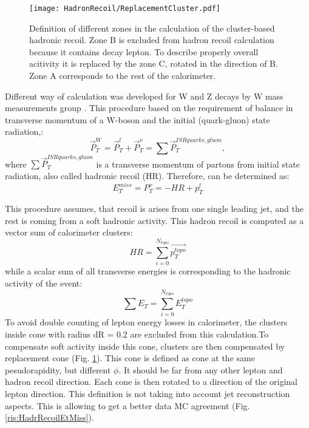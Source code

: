 \begin{figure}[!tbp]
\begin{center}
\begin{minipage}[h]{0.49\linewidth}
\texttt{[image: HadronRecoil/ReplacementCluster.pdf]}
\end{minipage}

\caption{Definition of different zones in the calculation of the cluster-based hadronic recoil. Zone B is excluded from hadron recoil calculation because it contains decay lepton. To describe properly overall acitivity it is replaced by the zone C, rotated in the direction of B. Zone A corresponds to the rest of the calorimeter.}
\label{ris:subsCone}
\end{center}
\end{figure}

Different way of \etmiss calculation  was developed for W and Z decays by W mass measurements group \cite{FirstHR}. This procedure based on the requirement of balance in transverse momentum of a W-boson and the initial (quark-gluon) state radiation,:
\begin{equation}
\vec{P}_{T}^{W} = \vec{P}_T^l+\vec{P}_T^{\nu}= \sum{\vec{P}_{T}^{ISRquarks,gluon}}, 
\end{equation}
where $\sum{\vec{P}_{T}^{ISRquarks,gluon}}$ is a transverse momentum of partons from initial state radiation, also called hadronic recoil (HR). Therefore, \etmiss can be determined as:
\begin{equation}
E_{T}^{miss} = P_T^{\nu} =  - HR + p_T^{l}
\end{equation} 

This procedure assumes, that recoil is arises from one single leading jet, and the rest  is coming from a soft hadronic activity. This hadron recoil is computed as a vector sum of calorimeter clusters:
\begin{equation}
HR= \sum_{i=0}^{N_{topo}}\vec{p_T^{topo}}
\end{equation}
while a scalar sum of all transverse energies is corresponding to the hadronic activity of the event:
\begin{equation}\label{eq:sumet}
\sum E_T =\sum_{i=0}^{N_{topo}} E_T^{topo}
\end{equation}
To avoid double counting of lepton energy losses in calorimeter, the clusters inside cone with radius dR = 0.2 are excluded from this calculation.To compensate soft activity inside this cone, clusters are then compensated by replacement cone (Fig. \ref{ris:subsCone}). This cone is defined as cone at the same pesudorapidity, but different $\phi$. It should be far from any other lepton and hadron recoil direction. Each cone is then rotated to a direction of the original lepton direction. This definition is not taking into account jet reconstruction aspects.   This is allowing to get a better data MC agreement (Fig. \ref{ris:HadrRecoilEtMiss}).


